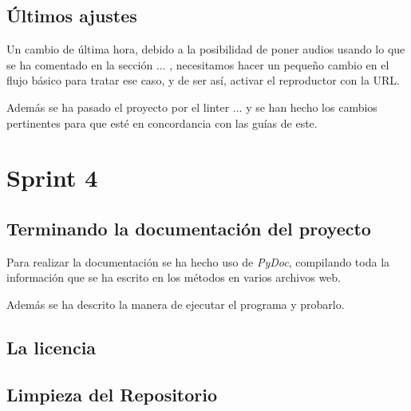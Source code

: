 \subsection{Últimos ajustes}

Un cambio de última hora, debido a la posibilidad de poner audios usando lo que se ha comentado en la sección ... , necesitamos hacer un pequeño cambio en el flujo básico para tratar ese caso, y de ser así,  activar el reproductor con la URL.

Además se ha pasado el proyecto por el linter ... y se han hecho los cambios pertinentes para que esté en concordancia con las guías de este.

\section{Sprint 4}
\subsection{Terminando la documentación del proyecto}
Para realizar la documentación se ha hecho uso de \textit{PyDoc}, compilando toda la información que se ha escrito en los métodos en varios archivos web.

Además se ha descrito la manera de ejecutar el programa y probarlo.
\subsection{La licencia}

\subsection{Limpieza del Repositorio}



